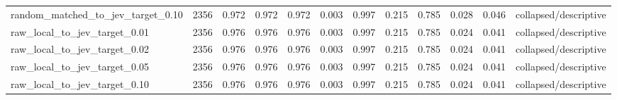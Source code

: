 \begin{tabular}{lrrrrrrrrrrr}
random\_matched\_to\_jev\_target\_0.10 & 2356 & 0.972 & 0.972 & 0.972 & 0.003 & 0.997 & 0.215 & 0.785 & 0.028 & 0.046 & collapsed/descriptive \\
raw\_local\_to\_jev\_target\_0.01 & 2356 & 0.976 & 0.976 & 0.976 & 0.003 & 0.997 & 0.215 & 0.785 & 0.024 & 0.041 & collapsed/descriptive \\
raw\_local\_to\_jev\_target\_0.02 & 2356 & 0.976 & 0.976 & 0.976 & 0.003 & 0.997 & 0.215 & 0.785 & 0.024 & 0.041 & collapsed/descriptive \\
raw\_local\_to\_jev\_target\_0.05 & 2356 & 0.976 & 0.976 & 0.976 & 0.003 & 0.997 & 0.215 & 0.785 & 0.024 & 0.041 & collapsed/descriptive \\
raw\_local\_to\_jev\_target\_0.10 & 2356 & 0.976 & 0.976 & 0.976 & 0.003 & 0.997 & 0.215 & 0.785 & 0.024 & 0.041 & collapsed/descriptive \\
\bottomrule
\end{tabular}
